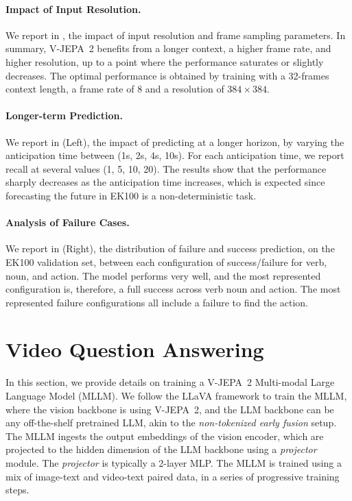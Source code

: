 \documentclass[]{fairmeta}
\newcommand{\model}{V-JEPA~2\xspace}
\begin{document}
\paragraph{\bf Impact of Input Resolution.} We report in , the impact of input resolution and frame sampling parameters. In summary, \model benefits from a longer context, a higher frame rate, and higher resolution, up to a point where the performance saturates or slightly decreases. The optimal performance is obtained by training with a 32-frames context length, a frame rate of 8 and a resolution of $384\times384$.

\paragraph{\bf Longer-term Prediction.} We report in  (Left), the impact of predicting at a longer horizon, by varying the anticipation time between (1s, 2s, 4s, 10s). For each anticipation time, we report recall at several values (1, 5, 10, 20). The results show that the performance sharply decreases as the anticipation time increases, which is expected since forecasting the future in EK100 is a non-deterministic task. 

\paragraph{\bf Analysis of Failure Cases.} We report in  (Right), the distribution of failure and success prediction, on the EK100 validation set, between each configuration of success/failure for verb, noun, and action. The model performs very well, and the most represented configuration is, therefore, a full success across verb noun and action. The most represented failure configurations all include a failure to find the action.







\section{Video Question Answering}
\label{app:language_alignment}

In this section, we provide details on training a \model Multi-modal Large Language Model (MLLM). We follow the LLaVA framework \citep{liu2024improved} to train the MLLM, where the vision backbone is using \model, and the LLM backbone can be any off-the-shelf pretrained LLM, akin to the \textit{non-tokenized early fusion} \citep{wadekar2024evolution} setup.  The MLLM ingests the output embeddings of the vision encoder, which are projected to the hidden dimension of the LLM backbone using a \textit{projector} module. The \textit{projector}  is typically a 2-layer MLP.  The MLLM  is trained using a mix of image-text and video-text paired data, in a series of progressive training steps.
\end{document}

